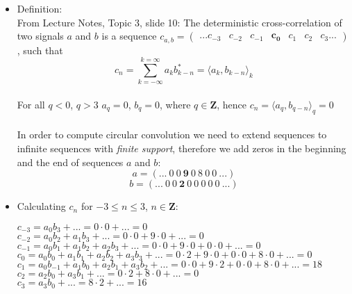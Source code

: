 \documentclass[12pt,a4paper]{article}
\begin{document}
        \begin{itemize}
        
            \item Definition:\\
        From Lecture Notes, Topic 3, slide 10: The deterministic cross-correlation of two signals $a$ and $b$ is a sequence $c_{a,b} = \begin{pmatrix}...c_{-3} & c_{-2} & c_{-1} & \boldsymbol{c_0} & c_1 & c_2 & c_3... \end{pmatrix}$, such that 
        $$c_n = \sum_{k=-\infty}^{k=\infty} a_kb^*_{k-n} = \langle a_k, b_{k-n}\rangle_k$$\\
        For all $q<0$, $q>3$ $a_q = 0$, $b_q = 0$, where $q \in \boldsymbol{Z}$, hence $c_n = \langle a_q, b_{q-n}\rangle_q = 0$\\
        \\
        In order to compute circular convolution we need to extend sequences to infinite sequences with \emph{finite support}, therefore we add zeros in the beginning and the end of sequences $a$ and $b$:
    $$a=(...\ 0\ 0\ \pmb{9}\ 0\ 8\ 0\ 0\ ...)$$$$b=(...\ 0\ 0\ \pmb{2}\ 0\ 0\ 0\ 0\ 0\ ...)$$
    

        \item Calculating $c_n$ for $-3\leq n \leq 3$, $n \in \boldsymbol{Z}$:
        
        $c_{-3} = a_0b_3 + ... = 0\cdot 0 + ... = 0$ \\
        $c_{-2} = a_0b_2 + a_1b_3 + ... = 0\cdot 0 + 9\cdot 0 + ... = 0$ \\
        $c_{-1} = a_0b_1 + a_1b_2 + a_2b_3 + ... = 0\cdot 0 + 9\cdot 0 + 0\cdot 0 + ... = 0$ \\
        $c_0 = a_0b_0 + a_1b_1 + a_2b_2 + a_3b_3 + ... = 0\cdot 2 + 9\cdot 0 + 0\cdot 0 + 8\cdot 0 + ... = 0$ \\
        $c_1 = a_0b_{-1} + a_1b_0 + a_2b_1 + a_3b_2 + ... = 0\cdot 0 + 9\cdot 2 + 0\cdot 0 + 8\cdot 0 + ... = 18$ \\
        $c_{2} = a_2b_0 + a_3b_1 + ... = 0\cdot 2 + 8\cdot 0 + ... = 0$ \\
        $c_{3} = a_3b_0 + ... = 8\cdot 2 + ... = 16$
        \end{itemize}
     
\end{document}
